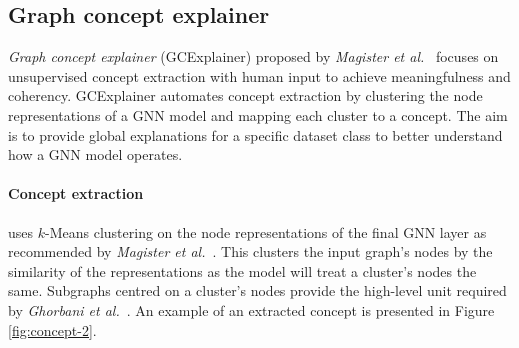 

\subsection{Graph concept explainer}
\label{sec:GCE}



\emph{Graph concept explainer} (GCExplainer) proposed by \textit{Magister et al.}~\cite{magister2021gcexplainer} focuses on unsupervised concept extraction with human input to achieve meaningfulness and coherency.
GCExplainer automates concept extraction by clustering the node representations of a GNN model and mapping each cluster to a concept.
The aim is to provide global explanations for a specific dataset class to better understand how a GNN model operates.



\paragraph{Concept extraction}
uses $k$-Means clustering on the node representations of the final GNN layer as recommended by \textit{Magister et al.}~\cite{magister2021gcexplainer}.
This clusters the input graph's nodes by the similarity of the representations as the model will treat a cluster's nodes the same.
Subgraphs centred on a cluster's nodes provide the high-level unit required by \textit{Ghorbani et al.}~\cite{ghorbani2019towards}.
An example of an extracted concept is presented in Figure \ref{fig:concept-2}.


